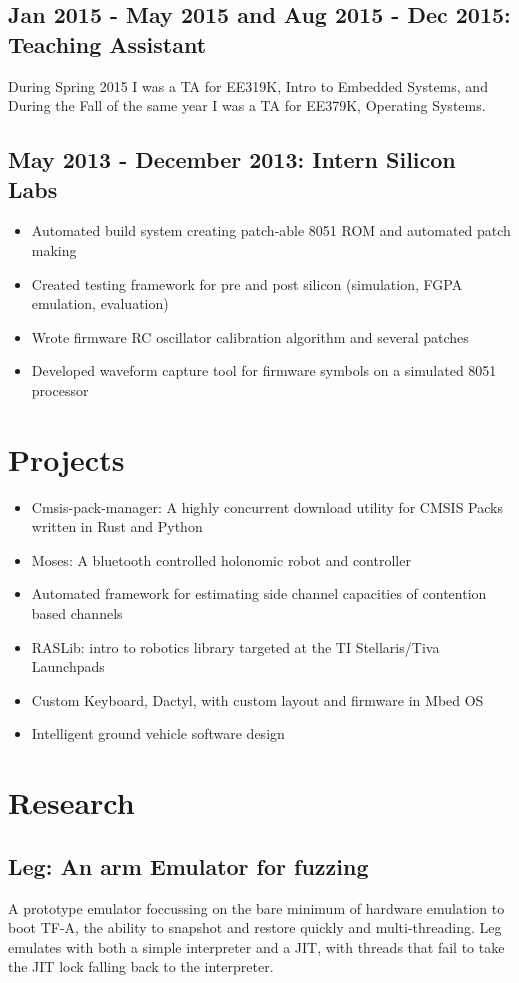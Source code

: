 \documentclass[letterpaper,12pt]{resume}
\begin{document}
\subsection{Jan 2015 - May 2015 and Aug 2015 - Dec 2015: Teaching Assistant}
During Spring 2015 I was a TA for EE319K, Intro to Embedded Systems, and During
the Fall of the same year I was a TA for EE379K, Operating Systems.

\subsection{May 2013 - December 2013: Intern Silicon Labs}
\begin{itemize}
  \item
    Automated build system creating patch-able 8051 ROM and automated patch making
  \item
    Created testing framework for pre and post silicon (simulation, FGPA emulation, evaluation)
  \item
    Wrote firmware RC oscillator calibration algorithm and several patches
  \item
    Developed waveform capture tool for firmware symbols on a simulated 8051 processor
\end{itemize}

\section{Projects}
\begin{itemize} 
  \item 
    Cmsis-pack-manager: A highly concurrent download utility for CMSIS Packs written in Rust and Python
  \item
    Moses: A bluetooth controlled holonomic robot and controller
  \item
    Automated framework for estimating side channel capacities of contention based channels
  \item
    RASLib: intro to robotics library targeted at the TI Stellaris/Tiva Launchpads
  \item
    Custom Keyboard, Dactyl, with custom layout and firmware in Mbed OS
  \item
    Intelligent ground vehicle software design
\end{itemize}

\section{Research}
\subsection{Leg: An arm Emulator for fuzzing}
A prototype emulator foccussing on the bare minimum of hardware emulation to
boot TF-A, the ability to snapshot and restore quickly and multi-threading.
Leg emulates with both a simple interpreter and a JIT, with threads that fail
to take the JIT lock falling back to the interpreter.
\end{document}

